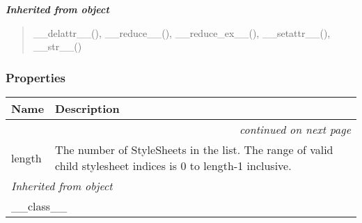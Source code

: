 \large{\textbf{\textit{Inherited from object}}}

\begin{quote}
\_\_delattr\_\_(), \_\_reduce\_\_(), \_\_reduce\_ex\_\_(), \_\_setattr\_\_(), \_\_str\_\_()
\end{quote}


  \subsubsection{Properties}

    \vspace{-1cm}
\hspace{\varindent}\begin{longtable}{|p{\varnamewidth}|p{\vardescrwidth}|l}
\cline{1-2}
\cline{1-2} \centering \textbf{Name} & \centering \textbf{Description}& \\
\cline{1-2}
\endhead\cline{1-2}\multicolumn{3}{r}{\small\textit{continued on next page}}\\\endfoot\cline{1-2}
\endlastfoot\raggedright l\-e\-n\-g\-t\-h\- & \raggedright The number of StyleSheets in the list. The range of valid
child stylesheet indices is 0 to length-1 inclusive.&\\
\cline{1-2}
\multicolumn{2}{|l|}{\textit{Inherited from object}}\\
\multicolumn{2}{|p{\varwidth}|}{\raggedright \_\_class\_\_}\\
\cline{1-2}
\end{longtable}


